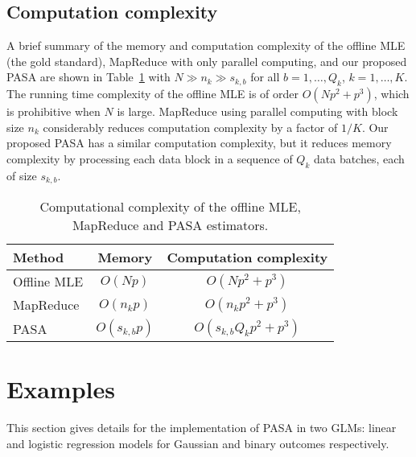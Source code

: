 \documentclass[12pt]{article}
\begin{document}
\subsection{Computation complexity}
\label{subsec:alg:computation}
A brief summary of the memory and computation complexity of the offline MLE (the gold standard), MapReduce with only parallel computing, and our proposed PASA are shown in Table~\ref{tab:computation} with $N \gg n_k \gg s_{k, b}$ for all $b=1, \ldots, Q_k$, $k=1, \ldots, K$. The running time complexity of the offline MLE is of order $O(Np^2+p^3)$, which is prohibitive when $N$ is large. MapReduce using parallel computing with block size $n_k$ considerably reduces computation complexity by a factor of $1/K$. Our proposed PASA has a similar computation complexity, but it reduces memory complexity by processing each data block in a sequence of $Q_k$ data batches, each of size $s_{k, b}$.
\begin{table}[ht]
\centering
\begin{tabular}{l|c c }
 Method      &Memory &Computation complexity \\
\hline
Offline MLE &$O(Np)$   & $O(Np^2+p^3)$   \\
MapReduce        &$O(n_kp)$ & $O(n_kp^2+p^3)$ \\
PASA        &$O(s_{k, b} p)$ & $O(s_{k, b}Q_kp^2+p^3)$ \\
\end{tabular}
\caption{Computational complexity of the offline MLE, MapReduce and PASA estimators.}
\label{tab:computation}
\end{table}

\section{Examples}
\label{sec:examples}
This section gives details for the implementation of PASA in two GLMs: linear and logistic regression models for Gaussian and binary outcomes respectively.
\end{document}
